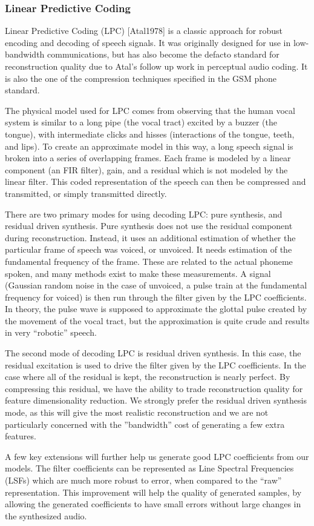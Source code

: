 \documentclass{article} %
\begin{document}
\subsubsection{Linear Predictive Coding}
Linear Predictive Coding (LPC) [Atal1978] is a classic approach for robust
encoding and decoding of speech signals. It was originally designed for
use in low-bandwidth communications, but has also become the defacto
standard for reconstruction quality due to Atal’s follow up work in perceptual
audio coding. It is also the one of the compression techniques specified in
the GSM phone standard. 
\par
The physical model used for LPC comes from observing that the human vocal
system is similar to a long pipe (the vocal tract) excited by a buzzer (the
tongue), with intermediate clicks and hisses (interactions of the tongue,
teeth, and lips). To create an approximate model in this way, a long speech
signal is broken into a series of overlapping frames. Each frame is modeled by
a linear component (an FIR filter), gain, and a residual which is not modeled
by the linear filter. This coded representation of the speech can then be
compressed and transmitted, or simply transmitted directly. 
\par
There are two primary modes for using decoding LPC: pure synthesis,
and residual driven synthesis. Pure synthesis does not use the residual
component during reconstruction. Instead, it uses an additional estimation of
whether the particular frame of speech was voiced, or unvoiced. It needs
estimation of the fundamental frequency of the frame. These are related to
the actual phoneme spoken, and many methods exist to make these measurements.
A signal (Gaussian random noise in the case of unvoiced, a pulse train at the
fundamental frequency for voiced) is then run through the filter given by the
LPC coefficients. In theory, the pulse wave is supposed to approximate
the glottal pulse created by the movement of the vocal tract, but the
approximation is quite crude and results in very “robotic” speech.
\par
The second mode of decoding LPC is residual driven synthesis. In this case,
the residual excitation is used to drive the filter given by the LPC
coefficients. In the case where all of the residual is kept, the
reconstruction is nearly perfect. By compressing this residual, we have the
ability to trade reconstruction quality for feature
dimensionality reduction. We strongly prefer the residual driven synthesis
mode, as this will give the most realistic reconstruction
and we are not particularly concerned with the ”bandwidth” cost of generating
a few extra features.
\par
A few key extensions will further help us generate good LPC coefficients
from our models. The filter coefficients can be represented as Line Spectral
Frequencies (LSFs) which are much more robust to error, when compared to
the “raw” representation. This improvement will help the quality of generated
samples, by allowing the generated coefficients to have small errors
without large changes in the synthesized audio.
\end{document}

